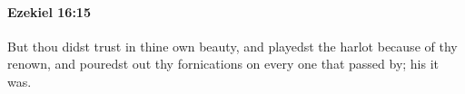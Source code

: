 
		\paragraph{Ezekiel 16:15} %
			\label{EZEKIEL-16-15}

			But thou didst trust in thine own beauty, and playedst the harlot because of thy renown, and pouredst out thy fornications on every one that passed by; his it was.


